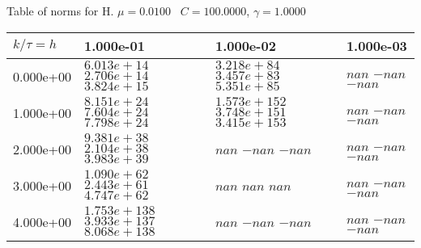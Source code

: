 \begin{center}
Table of norms for H. $\mu = 0.0100$ \, $C = 100.0000$, $\gamma = 1.0000$
  
\begin{tabular}{|p{1in}|p{1in}|p{1in}|p{1in}|} \hline
$k / \tau = h$ &1.000e-01 &1.000e-02 &1.000e-03 \\ \hline 
0.000e+00 & $6.013e+14$  $2.706e+14$  $3.824e+15$  & $3.218e+84$  $3.457e+83$  $5.351e+85$  & $nan$  $-nan$  $-nan$  \\ \hline 
1.000e+00 & $8.151e+24$  $7.604e+24$  $7.798e+24$  & $1.573e+152$  $3.748e+151$  $3.415e+153$  & $nan$  $-nan$  $-nan$  \\ \hline 
2.000e+00 & $9.381e+38$  $2.104e+38$  $3.983e+39$  & $nan$  $-nan$  $-nan$  & $nan$  $-nan$  $-nan$  \\ \hline 
3.000e+00 & $1.090e+62$  $2.443e+61$  $4.747e+62$  & $nan$  $nan$  $nan$  & $nan$  $-nan$  $-nan$  \\ \hline 
4.000e+00 & $1.753e+138$  $3.933e+137$  $8.068e+138$  & $nan$  $-nan$  $-nan$  & $nan$  $-nan$  $-nan$  \\ \hline 

\end{tabular}\\[20pt]
\end{center}
